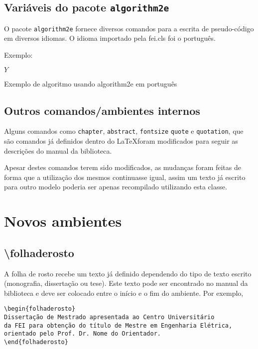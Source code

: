 \documentclass{fei}
\begin{document}
    \subsection{Variáveis do pacote \texttt{algorithm2e}}
    
    O pacote \texttt{algorithm2e} fornece diversos comandos para a escrita de pseudo-código em diversos idiomas. O idioma importado pela fei.cls foi o português.
    
    Exemplo:
    
\begin{algorithm}


\Retorna \(Y\)

\caption{Exemplo de algoritmo usando algorithm2e em português}
\label{lst:alg}
\end{algorithm}
    
    \subsection{Outros comandos/ambientes internos}
    
    Alguns comandos como \texttt{chapter}, \texttt{abstract}, \texttt{fontsize} \texttt{quote} e \texttt{quotation}, que são comandos já definidos dentro do \LaTeX foram modificados para seguir as descrições do manual da biblioteca.

    Apesar destes comandos terem sido modificados, as mudanças foram feitas de forma que a utilização dos mesmos continuasse igual, assim um texto já escrito para outro modelo poderia ser apenas recompilado utilizando esta classe.

\section{Novos ambientes}

    \subsection{\textbackslash folhaderosto}
    A folha de rosto recebe um texto já definido dependendo do tipo de texto escrito (monografia, dissertação ou tese). Este texto pode ser encontrado no manual da biblioteca e deve ser colocado entre o início e o fim do ambiente. Por exemplo,
    \begin{verbatim}
\begin{folhaderosto}
Dissertação de Mestrado apresentada ao Centro Universitário
da FEI para obtenção do título de Mestre em Engenharia Elétrica, 
orientado pelo Prof. Dr. Nome do Orientador. 
\end{folhaderosto}
    \end{verbatim}
\end{document}
